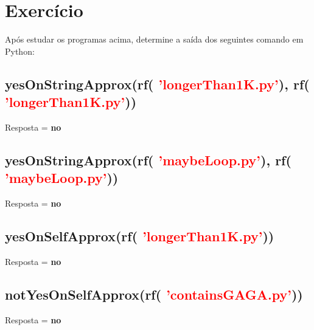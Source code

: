 \documentclass[12pt]{scrartcl}
\begin{document}
\section{Exercício}
Após estudar os programas acima, determine a saída dos seguintes comando em Python:

\subsection{yesOnStringApprox(rf( \textcolor{red}{'longerThan1K.py'}), rf( \textcolor{red}{'longerThan1K.py'}))}
Resposta = \textbf{no}

\subsection{yesOnStringApprox(rf( \textcolor{red}{'maybeLoop.py'}), rf( \textcolor{red}{'maybeLoop.py'}))}
Resposta = \textbf{no}

\subsection{yesOnSelfApprox(rf( \textcolor{red}{'longerThan1K.py'}))}
Resposta = \textbf{no}

\subsection{notYesOnSelfApprox(rf( \textcolor{red}{'containsGAGA.py'}))}
Resposta = \textbf{no}
\end{document}
